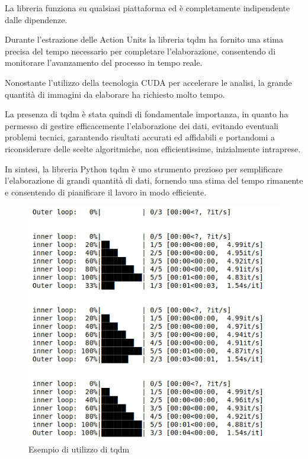 La libreria funziona su qualsiasi piattaforma ed è completamente indipendente dalle dipendenze. 

Durante l'estrazione delle Action Units la libreria tqdm ha fornito una stima precisa del tempo necessario per completare l'elaborazione, consentendo di monitorare l'avanzamento del processo in tempo reale. 

Nonostante l'utilizzo della tecnologia CUDA per accelerare le analisi, la grande quantità di immagini da elaborare ha richiesto molto tempo. 

La presenza di tqdm è stata quindi di fondamentale importanza, in quanto ha permesso di gestire efficacemente l'elaborazione dei dati, evitando eventuali problemi tecnici, garantendo risultati accurati ed affidabili e portandomi a riconsiderare delle scelte algoritmiche, non efficientissime, inizialmente intraprese. 

In sintesi, la libreria Python tqdm è uno strumento prezioso per semplificare l'elaborazione di grandi quantità di dati, fornendo una stima del tempo rimanente e consentendo di pianificare il lavoro in modo efficiente.

\begin{figure}
    \begin{center}    
        \includegraphics[width=0.9\linewidth]{images/image5.png}
        \caption{Esempio di utilizzo di tqdm}
    \end{center}
\end{figure}


